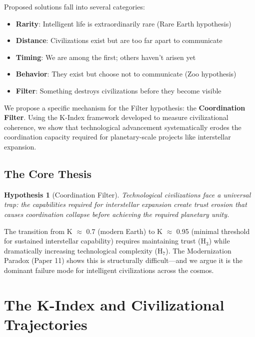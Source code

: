 \documentclass[11pt,a4paper]{article}
\newtheorem{hypothesis}{Hypothesis}
\begin{document}
Proposed solutions fall into several categories:
\begin{itemize}
    \item \textbf{Rarity}: Intelligent life is extraordinarily rare (Rare Earth hypothesis)
    \item \textbf{Distance}: Civilizations exist but are too far apart to communicate
    \item \textbf{Timing}: We are among the first; others haven't arisen yet
    \item \textbf{Behavior}: They exist but choose not to communicate (Zoo hypothesis)
    \item \textbf{Filter}: Something destroys civilizations before they become visible
\end{itemize}

We propose a specific mechanism for the Filter hypothesis: the \textbf{Coordination Filter}. Using the K-Index framework developed to measure civilizational coherence, we show that technological advancement systematically erodes the coordination capacity required for planetary-scale projects like interstellar expansion.

\subsection{The Core Thesis}

\begin{hypothesis}[Coordination Filter]
Technological civilizations face a universal trap: the capabilities required for interstellar expansion create trust erosion that causes coordination collapse before achieving the required planetary unity.
\end{hypothesis}

The transition from K $\approx$ 0.7 (modern Earth) to K $\approx$ 0.95 (minimal threshold for sustained interstellar capability) requires maintaining trust (H$_3$) while dramatically increasing technological complexity (H$_7$). The Modernization Paradox (Paper 11) shows this is structurally difficult---and we argue it is the dominant failure mode for intelligent civilizations across the cosmos.

\section{The K-Index and Civilizational Trajectories}
\end{document}

